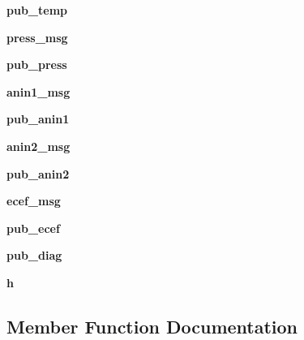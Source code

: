 \begin{DoxyCompactItemize}
{\bfseries pub\+\_\+temp}
\item 
\mbox{\label{classmtnode_1_1XSensDriver_a12be7c1b55785c2919cc6f651f0ba556}} 
{\bfseries press\+\_\+msg}
\item 
\mbox{\label{classmtnode_1_1XSensDriver_aedeb018bdea33ac840a0f635cb40bd74}} 
{\bfseries pub\+\_\+press}
\item 
\mbox{\label{classmtnode_1_1XSensDriver_ad7b1fc141b7bbda2476d3b91f43a2987}} 
{\bfseries anin1\+\_\+msg}
\item 
\mbox{\label{classmtnode_1_1XSensDriver_a346c4805ff8467cb709b2fe4d059fbc4}} 
{\bfseries pub\+\_\+anin1}
\item 
\mbox{\label{classmtnode_1_1XSensDriver_a565620a872ecdb5ddb7019257d64e0e7}} 
{\bfseries anin2\+\_\+msg}
\item 
\mbox{\label{classmtnode_1_1XSensDriver_a96b8036fe31c350d9b12cfb10a4b0e38}} 
{\bfseries pub\+\_\+anin2}
\item 
\mbox{\label{classmtnode_1_1XSensDriver_ab76cfc8ff2d3681d411fd1f27d731b40}} 
{\bfseries ecef\+\_\+msg}
\item 
\mbox{\label{classmtnode_1_1XSensDriver_af77134a31a9c935c0061805f8f015a4f}} 
{\bfseries pub\+\_\+ecef}
\item 
\mbox{\label{classmtnode_1_1XSensDriver_a9af5fa58a518d2cb135041cb69373fa9}} 
{\bfseries pub\+\_\+diag}
\item 
\mbox{\label{classmtnode_1_1XSensDriver_a0fc3d2a5a9243edea2f358fe64761ca0}} 
{\bfseries h}
\end{DoxyCompactItemize}


\subsection{Member Function Documentation}
\mbox{\label{classmtnode_1_1XSensDriver_aff28c45fee0b35e2d479cebb913ed3f1}} 
